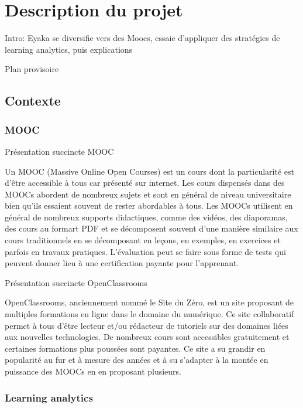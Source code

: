 \chapter{Description du projet}

    Intro: Eyaka se diversifie vers des Moocs, essaie d'appliquer des stratégies de learning analytics, puis explications


    Plan provisoire

    \section{Contexte  }
        \subsection{MOOC  }

        Présentation succincte MOOC
        
            Un MOOC (Massive Online Open Courses) est un cours dont la particularité est d’être accessible à tous car présenté sur internet. Les cours dispensés dans des MOOCs abordent de nombreux sujets et sont en général de niveau universitaire bien qu’ils essaient souvent de rester abordables à tous.
            Les MOOCs utilisent en général de nombreux supports didactiques, comme des vidéos, des diaporamas, des cours au formart PDF et se décomposent souvent d’une manière similaire aux cours traditionnels en se décomposant en leçons, en exemples, en exercices et parfois en travaux pratiques. L’évaluation peut se faire sous forme de tests qui peuvent donner lieu à une certification payante pour l’apprenant.
        
        
        
        Présentation succincte OpenClassrooms
        
        
            OpenClassrooms, anciennement nommé le Site du Zéro, est un site proposant de multiples formations en ligne dans le domaine du numérique. Ce site collaboratif permet à tous d’être lecteur et/ou rédacteur de tutoriels sur des domaines liées aux nouvelles technologies. De nombreux cours sont accessibles gratuitement et certaines formations plus poussées sont payantes. Ce site a su grandir en popularité au fur et à mesure des années et à su s’adapter à la montée en puissance des MOOCs en en proposant plusieurs.
        
        
        



        \subsection{Learning analytics }
   
